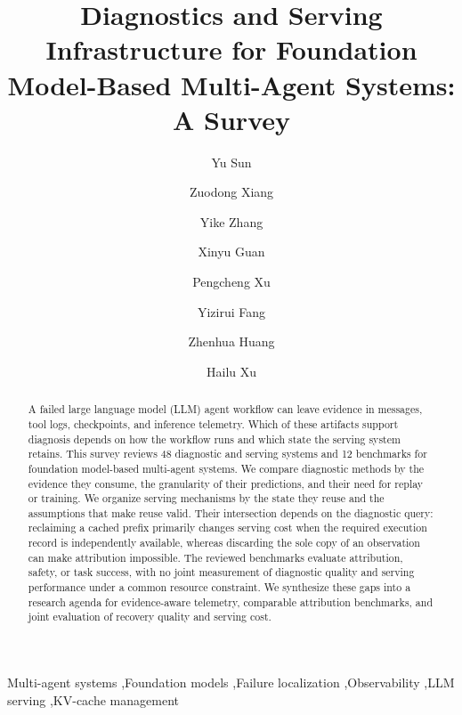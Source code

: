 \documentclass[preprint,12pt]{elsarticle}
\begin{document}
\begin{frontmatter}
\title{Diagnostics and Serving Infrastructure for Foundation Model-Based Multi-Agent Systems: A Survey}
\author[upenn]{Yu Sun}
\author[ucd]{Zuodong Xiang}\author[jhu]{Yike Zhang}
\author[glasgow]{Xinyu Guan}\author[uci]{Pengcheng Xu}
\author[jhu]{Yizirui Fang}\author[scnu]{Zhenhua Huang}
\author[csulb]{Hailu Xu}
\address[upenn]{School of Engineering and Applied Science, University of Pennsylvania, Philadelphia, PA, USA}
\address[ucd]{Department of Electrical and Computer Engineering, University of California, Davis, CA, USA}
\address[jhu]{Department of Computer Science, Johns Hopkins University, Baltimore, MD, USA}
\address[glasgow]{University of Glasgow, Scotland, United Kingdom}
\address[uci]{Department of Computer Science, University of California, Irvine, CA, USA}
\address[scnu]{School of Computer Science, South China Normal University, Guangzhou, China}
\address[csulb]{Department of Computer Engineering and Computer Science, California State University, Long Beach, CA, USA}
\begin{abstract}
A failed large language model (LLM) agent workflow can leave evidence in messages, tool logs, checkpoints, and inference telemetry. Which of these artifacts support diagnosis depends on how the workflow runs and which state the serving system retains. This survey reviews 48 diagnostic and serving systems and 12 benchmarks for foundation model-based multi-agent systems. We compare diagnostic methods by the evidence they consume, the granularity of their predictions, and their need for replay or training. We organize serving mechanisms by the state they reuse and the assumptions that make reuse valid. Their intersection depends on the diagnostic query: reclaiming a cached prefix primarily changes serving cost when the required execution record is independently available, whereas discarding the sole copy of an observation can make attribution impossible. The reviewed benchmarks evaluate attribution, safety, or task success, with no joint measurement of diagnostic quality and serving performance under a common resource constraint. We synthesize these gaps into a research agenda for evidence-aware telemetry, comparable attribution benchmarks, and joint evaluation of recovery quality and serving cost.
\end{abstract}

\begin{keyword}Multi-agent systems \sep Foundation models \sep Failure localization \sep Observability \sep LLM serving \sep KV-cache management\end{keyword}
\end{frontmatter}
\end{document}
